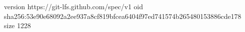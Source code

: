 version https://git-lfs.github.com/spec/v1
oid sha256:53e90e68092a2ee937a8cf819bfcea6404f97ed741574b265480153886cde178
size 1228
